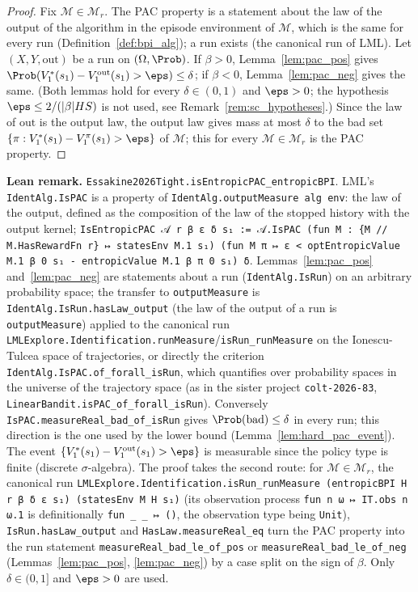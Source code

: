 \begin{proof}
\leanok
Fix $\mathcal M \in \mathcal M_r$. The PAC property is a statement about the law of the output
of the algorithm in the episode environment of $\mathcal M$, which is the same for every run
(Definition~\ref{def:bpi_alg}); a run exists (the canonical run of LML). Let
$(X, Y, \mathrm{out})$ be a run on $(\Omega, \Prob)$. If $\beta > 0$, Lemma~\ref{lem:pac_pos}
gives $\Prob(V^*_1(s_1) - V^{\mathrm{out}}_1(s_1) > \eps) \le \delta$; if $\beta < 0$,
Lemma~\ref{lem:pac_neg} gives the same. (Both lemmas hold for every $\delta \in (0,1)$ and
$\eps > 0$; the hypothesis $\eps \le 2/(|\beta|HS)$ is not used, see
Remark~\ref{rem:sc_hypotheses}.) Since the law of $\mathrm{out}$ is the output law, the
output law gives mass at most $\delta$ to the bad set $\{\pi : V^*_1(s_1) - V^\pi_1(s_1) > \eps\}$
of $\mathcal M$; this for every $\mathcal M \in \mathcal M_r$ is the PAC property.
\end{proof}

\textbf{Lean remark.} \texttt{Essakine2026Tight.isEntropicPAC\_entropicBPI}. LML's
\texttt{IdentAlg.IsPAC} is a property of \texttt{IdentAlg.outputMeasure alg env}: the law of the
output, defined as the composition of the law of the stopped history with the output kernel;
\texttt{IsEntropicPAC 𝒜 r β ε δ s₁ := 𝒜.IsPAC (fun M : \{M // M.HasRewardFn r\} ↦ statesEnv M.1 s₁) (fun M π ↦ ε < optEntropicValue M.1 β 0 s₁ - entropicValue M.1 β π 0 s₁) δ}.
Lemmas~\ref{lem:pac_pos} and~\ref{lem:pac_neg} are statements about a run
(\texttt{IdentAlg.IsRun}) on an arbitrary probability space; the transfer to
\texttt{outputMeasure} is \texttt{IdentAlg.IsRun.hasLaw\_output} (the law of the output of a
run is \texttt{outputMeasure}) applied to the canonical run
\texttt{LMLExplore.Identification.runMeasure}/\texttt{isRun\_runMeasure} on the Ionescu-Tulcea space of
trajectories, or directly the criterion \texttt{IdentAlg.IsPAC.of\_forall\_isRun}, which
quantifies over probability spaces in the universe of the trajectory space (as in the sister
project \texttt{colt-2026-83}, \texttt{LinearBandit.isPAC\_of\_forall\_isRun}). Conversely
\texttt{IsPAC.measureReal\_bad\_of\_isRun} gives $\Prob(\mathrm{bad}) \le \delta$ in every run; this
direction is the one used by the lower bound (Lemma~\ref{lem:hard_pac_event}). The event
$\{V^*_1(s_1) - V^{\mathrm{out}}_1(s_1) > \eps\}$ is measurable since the policy type is finite
(discrete $\sigma$-algebra). The proof takes the second route: for $\mathcal M \in \mathcal M_r$, the canonical run
\texttt{LMLExplore.Identification.isRun\_runMeasure (entropicBPI H r β δ ε s₁) (statesEnv M H s₁)} (its observation process
\texttt{fun n ω ↦ IT.obs n ω.1} is definitionally \texttt{fun \_ \_ ↦ ()}, the observation type being
\texttt{Unit}), \texttt{IsRun.hasLaw\_output} and \texttt{HasLaw.measureReal\_eq} turn the PAC property into
the run statement \texttt{measureReal\_bad\_le\_of\_pos} or \texttt{measureReal\_bad\_le\_of\_neg}
(Lemmas~\ref{lem:pac_pos}, \ref{lem:pac_neg}) by a case split on the sign of $\beta$. Only $\delta \in (0, 1]$ and
$\eps > 0$ are used.

